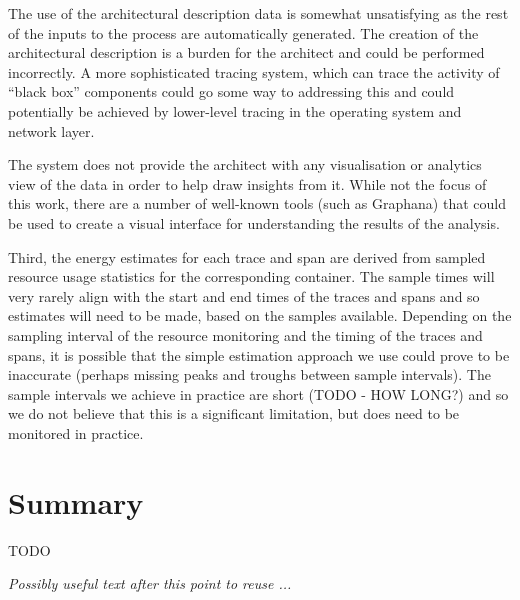 The use of the architectural description data is somewhat unsatisfying as the rest of the inputs to the process are automatically generated.  The creation of the architectural description is a burden for the architect and could be performed incorrectly.  A more sophisticated tracing system, which can trace the activity of “black box” components could go some way to addressing this and could potentially be achieved by lower-level tracing in the operating system and network layer.

The system does not provide the architect with any visualisation or analytics view of the data in order to help draw insights from it.  While not the focus of this work, there are a number of well-known tools (such as Graphana) that could be used to create a visual interface for understanding the results of the analysis.

Third, the energy estimates for each trace and span are derived from sampled resource usage statistics for the corresponding container.  The sample times will very rarely align with the start and end times of the traces and spans and so estimates will need to be made, based on the samples available.  Depending on the sampling interval of the resource monitoring and the timing of the traces and spans, it is possible that the simple estimation approach we use could prove to be inaccurate (perhaps missing peaks and troughs between sample intervals).  The sample intervals we achieve in practice are short (TODO - HOW LONG?) and so we do not believe that this is a significant limitation, but does need to be monitored in practice.

\section{Summary}

TODO

\textit{Possibly useful text after this point to reuse ...}


